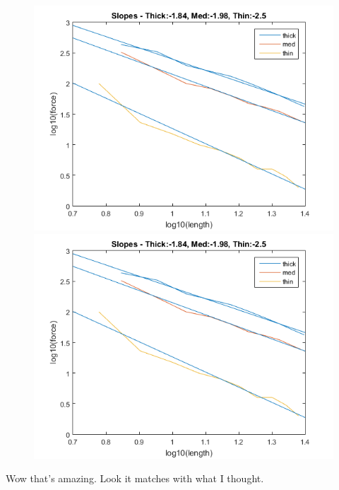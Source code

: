 \documentclass{article}
\begin{document}
\begin{figure}[h]
	\begin{minipage}{.5\textwidth}
		\centering
		\includegraphics[scale=.3]{Lab1f1.png}
	\end{minipage}		
	\begin{minipage}{.5\textwidth}
		\centering
		\includegraphics[scale=.3]{Lab1f1.png}
	\end{minipage}
\end{figure}

Wow that's amazing. Look it matches with what I thought.
\end{document}
